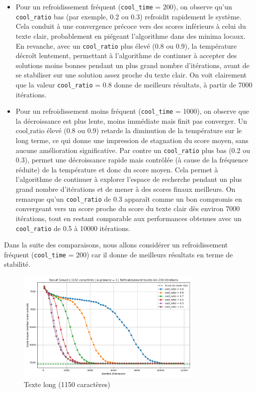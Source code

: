 \documentclass[a4paper]{article}
\begin{document}
\begin{itemize}
    \item Pour un refroidissement fréquent (\texttt{cool\_time} = 200), on observe qu'un \texttt{cool\_ratio} bas (par exemple, 0.2 ou 0.3) refroidit rapidement le système. Cela conduit à une convergence précoce vers des scores inférieurs à celui du texte clair, probablement en piégeant l'algorithme dans des minima locaux. 
          En revanche, avec un \texttt{cool\_ratio} plus élevé (0.8 ou 0.9), la température décroît lentement, permettant à l’algorithme de continuer à accepter des solutions moins bonnes pendant un plus grand nombre d’itérations, avant de se stabiliser sur une solution assez proche du texte clair. 
          On voit clairement que la valeur \texttt{cool\_ratio} = 0.8 donne de meilleurs résultats, à partir de 7000 itérations.
    \item Pour un refroidissement moins fréquent (\texttt{cool\_time} = 1000), on observe que la décroissance est plus lente, moins immédiate mais finit pas converger. Un \(\text{cool\_ratio}\) élevé (0.8 ou 0.9) retarde la diminution de la température sur le long terme, ce qui donne une impression de stagnation du score moyen, sans aucune amélioration significative.
          Par contre un \texttt{cool\_ratio} plus bas (0.2 ou 0.3), permet une décroissance rapide mais contrôlée (à cause de la fréquence réduite) de la température et donc du score moyen. Cela permet à l'algorithme de continuer à explorer l'espace de recherche pendant un plus grand nombre d'itérations et de mener à des scores finaux meilleurs. 
          On remarque qu'un \texttt{cool\_ratio} de 0.3 apparaît comme un bon compromis en convergeant vers un score proche du score du texte clair dès environ 7000 itérations, tout en restant comparable aux performances obtenues avec un \texttt{cool\_ratio} de 0.5 à 10000 itérations.
\end{itemize}

Dans la suite des comparaisons, nous allons considérer un refroidissement fréquent (\texttt{cool\_time} = 200) car il donne de meilleurs résultats en terme de stabilité.

\begin{figure}[H]
    \centering
    \includegraphics[width=0.8\textwidth, keepaspectratio, height=0.6\textheight]{graphe_recuit_n_3_1150_cool_time_200.png}
    \caption{Texte long (1150 caractères)}
    \label{fig:n3-110-1000}
\end{figure}
\end{document}
